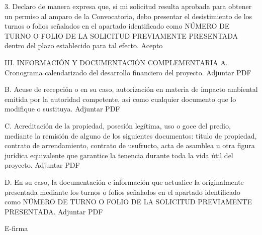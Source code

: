  3.	Declaro de manera expresa que, si mi solicitud resulta aprobada para obtener un permiso al amparo de la Convocatoria, debo presentar el desistimiento de los turnos o folios señalados en el apartado identificado como NÚMERO DE TURNO O FOLIO DE LA SOLICITUD PREVIAMENTE PRESENTADA dentro del plazo establecido para tal efecto. 
  Acepto
 
 
III.	INFORMACIÓN Y DOCUMENTACIÓN COMPLEMENTARIA
A.	Cronograma calendarizado del desarrollo financiero del proyecto.
 Adjuntar PDF
 
 B.	Acuse de recepción o en su caso, autorización en materia de impacto ambiental emitida por la autoridad competente, así como cualquier documento que lo modifique o sustituya. 
 Adjuntar PDF
 
 C.	Acreditación de la propiedad, posesión legítima, uso o goce del predio, mediante la remisión de alguno de los siguientes documentos: título de propiedad, contrato de arrendamiento, contrato de usufructo, acta de asamblea u otra figura jurídica equivalente que garantice la tenencia durante toda la vida útil del proyecto.
 Adjuntar PDF
 
 D.	En su caso, la documentación e información que actualice la originalmente presentada mediante los turnos o folios señalados en el apartado identificado como NÚMERO DE TURNO O FOLIO DE LA SOLICITUD PREVIAMENTE PRESENTADA.
 Adjuntar PDF
 
 

E-firma
 
